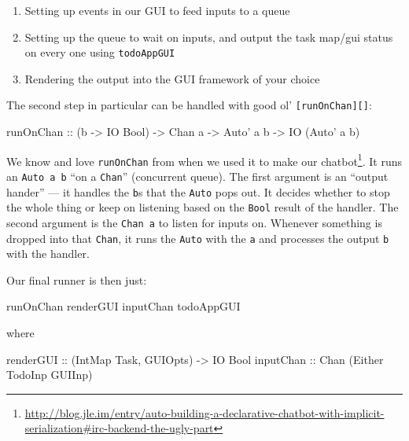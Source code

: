 \documentclass[]{article}
\newenvironment{Shaded}{}{}
\newcommand{\DataTypeTok}[1]{\textcolor[rgb]{0.56,0.13,0.00}{{#1}}}
\newcommand{\OtherTok}[1]{\textcolor[rgb]{0.00,0.44,0.13}{{#1}}}
\newcommand{\NormalTok}[1]{{#1}}
\renewcommand{\href}[2]{#2\footnote{\url{#1}}}
\begin{document}
\begin{enumerate}
\def\labelenumi{\arabic{enumi}.}
\tightlist
\item
  Setting up events in our GUI to feed inputs to a queue
\item
  Setting up the queue to wait on inputs, and output the task map/gui status on
  every one using \texttt{todoAppGUI}
\item
  Rendering the output into the GUI framework of your choice
\end{enumerate}

The second step in particular can be handled with good ol'
\texttt{{[}runOnChan{]}{[}{]}}:

\begin{Shaded}
\begin{Highlighting}[]
\OtherTok{runOnChan ::} \NormalTok{(b }\OtherTok{->} \DataTypeTok{IO} \DataTypeTok{Bool}\NormalTok{) }\OtherTok{->} \DataTypeTok{Chan} \NormalTok{a }\OtherTok{->} \DataTypeTok{Auto'} \NormalTok{a b }\OtherTok{->} \DataTypeTok{IO} \NormalTok{(}\DataTypeTok{Auto'} \NormalTok{a b)}
\end{Highlighting}
\end{Shaded}

We know and love \texttt{runOnChan} from when we used it to make our
\href{http://blog.jle.im/entry/auto-building-a-declarative-chatbot-with-implicit-serialization\#irc-backend-the-ugly-part}{chatbot}.
It runs an \texttt{Auto\textquotesingle{}\ a\ b} ``on a \texttt{Chan}''
(concurrent queue). The first argument is an ``output hander'' --- it handles
the \texttt{b}s that the \texttt{Auto\textquotesingle{}} pops out. It decides
whether to stop the whole thing or keep on listening based on the \texttt{Bool}
result of the handler. The second argument is the \texttt{Chan\ a} to listen for
inputs on. Whenever something is dropped into that \texttt{Chan}, it runs the
\texttt{Auto\textquotesingle{}} with the \texttt{a} and processes the output
\texttt{b} with the handler.

Our final runner is then just:

\begin{Shaded}
\begin{Highlighting}[]
\NormalTok{runOnChan renderGUI inputChan todoAppGUI}
\end{Highlighting}
\end{Shaded}

where

\begin{Shaded}
\begin{Highlighting}[]
\OtherTok{renderGUI ::} \NormalTok{(}\DataTypeTok{IntMap} \DataTypeTok{Task}\NormalTok{, }\DataTypeTok{GUIOpts}\NormalTok{) }\OtherTok{->} \DataTypeTok{IO} \DataTypeTok{Bool}
\OtherTok{inputChan ::} \DataTypeTok{Chan} \NormalTok{(}\DataTypeTok{Either} \DataTypeTok{TodoInp} \DataTypeTok{GUIInp}\NormalTok{)}
\end{Highlighting}
\end{Shaded}
\end{document}
